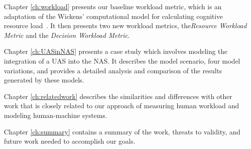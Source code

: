 Chapter \ref{ch:workload} presents our baseline workload metric, which is an adaptation of the Wickens' computational model for calculating cognitive resource load~\cite{wickens2002multiple}.  It then presents two new workload metrics, the{\em Resource Workload Metric} and the {\em Decision Workload Metric}.

Chapter \ref{ch:UASinNAS} presents a case study which involves modeling the integration of a UAS into the NAS.  It describes the model scenario, four model variations, and provides a detailed analysis and comparison of the results generated by these models.

Chapter \ref{ch:relatedwork} describes the similarities and differences with other work that is closely related to our approach of measuring human workload and modeling human-machine systems.

Chapter \ref{ch:summary} contains a summary of the work, threats to validity, and future work needed to accomplish our goals.

\begin{comment}
The appendices include the initial WiSAR proposal, the core modeling framework classes, an XML model, and simulation logs.
\end{comment}